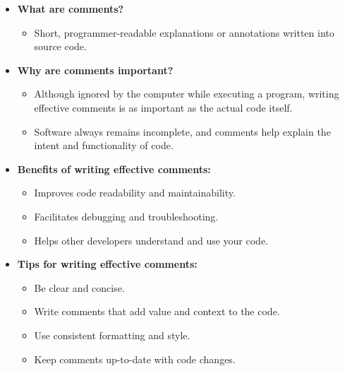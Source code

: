 %
%
%
%




{ 
	
	
	
	\begin{itemize}
		\item \textbf {What are comments?}
		\begin{itemize}
			\item Short, programmer-readable explanations or annotations written into source code.
		\end{itemize}
		\item \textbf {Why are comments important?}
		\begin{itemize}
			\item Although ignored by the computer while executing a program, writing effective comments is as important as the actual code itself.
			\item Software always remains incomplete, and comments help explain the intent and functionality of code.
		\end{itemize}
		\item \textbf {Benefits of writing effective comments:}
		\begin{itemize}
			\item Improves code readability and maintainability.
			\item Facilitates debugging and troubleshooting.
			\item Helps other developers understand and use your code.
		\end{itemize}
		\item \textbf {Tips for writing effective comments:}
		\begin{itemize}
			\item Be clear and concise.
			\item Write comments that add value and context to the code.
			\item Use consistent formatting and style.
			\item Keep comments up-to-date with code changes. \cite{Pykes:2022}
		\end{itemize}
		
	\end{itemize}	 
}


